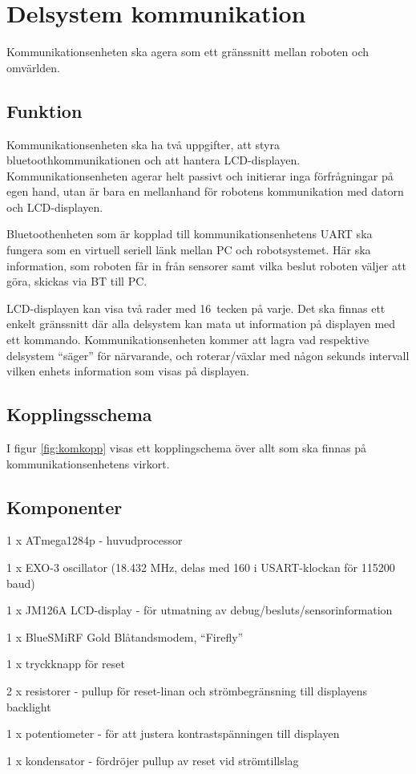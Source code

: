 \section{Delsystem kommunikation}
Kommunikationsenheten ska agera som ett gränssnitt mellan roboten och omvärlden.

\subsection{Funktion}
Kommunikationsenheten ska ha två uppgifter, att styra bluetoothkommunikationen och att hantera LCD-displayen. Kommunikationsenheten agerar helt passivt och initierar inga förfrågningar på egen hand, utan är bara en mellanhand för robotens kommunikation med datorn och LCD-displayen.

Bluetoothenheten som är kopplad till kommunikationsenhetens UART ska fungera som en virtuell seriell länk mellan PC och robotsystemet. Här ska information, som roboten får in från sensorer samt vilka beslut roboten väljer att göra, skickas via BT till PC.

LCD-displayen kan visa två rader med 16~tecken på varje. Det ska finnas ett enkelt gränssnitt där alla delsystem kan mata ut information på displayen med ett kommando. Kommunikationsenheten kommer att lagra vad respektive delsystem “säger” för närvarande, och roterar/växlar med någon sekunds intervall vilken enhets information som visas på displayen. 


\subsection{Kopplingsschema}
I figur \ref{fig:komkopp} visas ett kopplingschema över allt som ska finnas på kommunikationsenhetens virkort.


\subsection{Komponenter}
\begin{packed_itemize}
\item 1 x ATmega1284p - huvudprocessor
\item 1 x EXO-3 oscillator (18.432 MHz, delas med 160 i USART-klockan för 115200 baud)
\item 1 x JM126A LCD-display - för utmatning av debug/besluts/sensorinformation
\item 1 x BlueSMiRF Gold Blåtandsmodem, “Firefly”
\item 1 x tryckknapp för reset
\item 2 x resistorer - pullup för reset-linan och strömbegränsning till displayens backlight
\item 1 x potentiometer - för att justera kontrastspänningen till displayen
\item 1 x kondensator - fördröjer pullup av reset vid strömtillslag
\end{packed_itemize}

